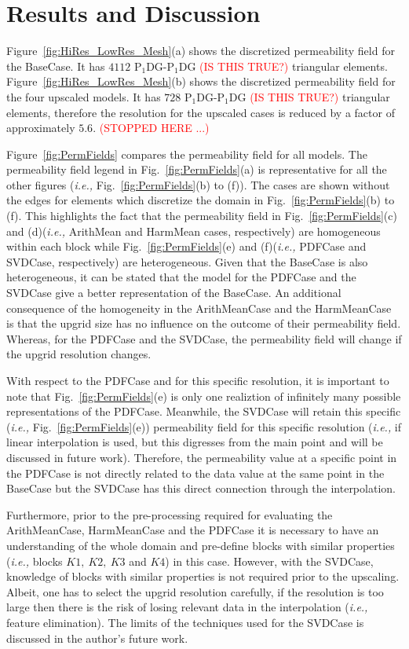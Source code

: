 \documentclass[preprint,12pt]{elsarticle}
\newcommand{\red}{\textcolor{red}}
\newcommand{\PNDG}[2][error]{P$_{#1}$DG-P$_{#2}$DG}
\newcommand{\ie}{{\it i.e., }}
\begin{document}
\section{Results and Discussion}\label{section:results_discussion}

Figure~\ref{fig:HiRes_LowRes_Mesh}(a) shows the discretized permeability field for the BaseCase. It has $4112$ \PNDG[1]{1} \red{(IS THIS TRUE?)} triangular elements. Figure~\ref{fig:HiRes_LowRes_Mesh}(b) shows the discretized permeability field for the four upscaled models. It has $728$ \PNDG[1]{1} \red{(IS THIS TRUE?)} triangular elements, therefore the resolution for the upscaled cases is reduced by a factor of approximately $5.6$. \red{(STOPPED HERE ...)}

Figure~\ref{fig:PermFields} compares the permeability field for all models. The permeability field legend in Fig.~\ref{fig:PermFields}(a) is representative for all the other figures (\ie Fig.~\ref{fig:PermFields}(b) to (f)). The cases are shown without the edges for elements which discretize the domain in Fig.~\ref{fig:PermFields}(b) to (f). This highlights the fact that the permeability field in  Fig.~\ref{fig:PermFields}(c) and (d)(\ie ArithMean and HarmMean cases, respectively) are homogeneous within each block while Fig.~\ref{fig:PermFields}(e) and (f)(\ie PDFCase and SVDCase, respectively) are heterogeneous. Given that the BaseCase is also heterogeneous, it can be stated that the model for the PDFCase and the SVDCase give a better representation of the BaseCase. An additional consequence of the homogeneity in the ArithMeanCase and the HarmMeanCase is that the upgrid size has no influence on the outcome of their permeability field. Whereas, for the PDFCase and the SVDCase, the permeability field will change if the upgrid resolution changes.

With respect to the PDFCase and for this specific resolution, it is important to note that Fig.~\ref{fig:PermFields}(e) is only one realiztion of infinitely many possible representations of the PDFCase. Meanwhile, the SVDCase will retain this specific (\ie Fig.~\ref{fig:PermFields}(e)) permeability field for this specific resolution (\ie if linear interpolation is used, but this digresses from the main point and will be discussed in future work). Therefore, the permeability value at a specific point in the PDFCase is not directly related to the data value at the same point in the BaseCase but the SVDCase has this direct connection through the interpolation.

Furthermore, prior to the pre-processing required for evaluating the ArithMeanCase, HarmMeanCase and the PDFCase it is necessary to have an understanding of the whole domain and pre-define blocks with similar properties (\ie blocks $K1,~K2,~K3$ and $K4$) in this case. However, with the SVDCase, knowledge of blocks with similar properties is not required prior to the upscaling. Albeit, one has to select the upgrid resolution carefully, if the resolution is too large then there is the risk of losing relevant data in the interpolation (\ie feature elimination). The limits of the techniques used for the SVDCase is discussed in the author's future work.
\end{document}
